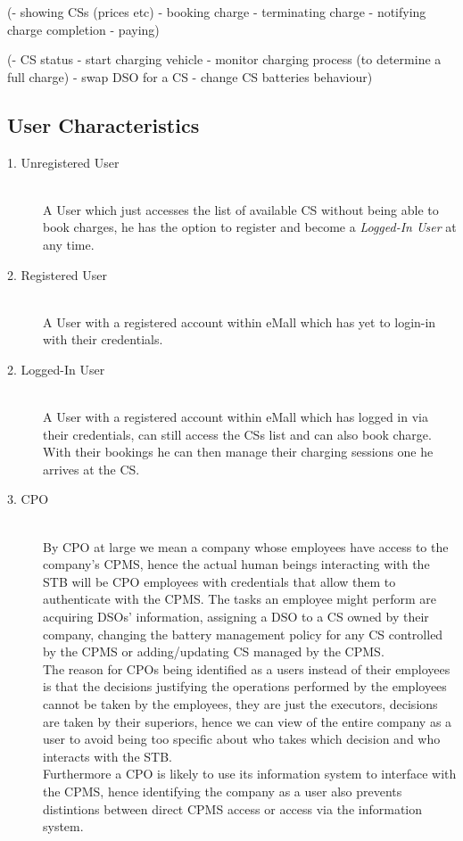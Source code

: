 \documentclass[11pt]{article}
\begin{document}
(- showing CSs (prices etc)
- booking charge
- terminating charge
- notifying charge completion
- paying)

(- CS status
- start charging vehicle
- monitor charging process (to determine a full charge)
- swap DSO for a CS
- change CS batteries behaviour)

\subsection{User Characteristics}

\begin{description}
    \item [1. Unregistered User] \hfill \\
        A User which just accesses the list of available CS without being able to book charges, he has the option to register and become a \textit{Logged-In User} at any time.
    \item [2. Registered User] \hfill \\
        A User with a registered account within eMall which has yet to login-in with their credentials.
    \item [2. Logged-In User] \hfill \\
        A User with a registered account within eMall which has logged in via their credentials, can still access the CSs list and can also book charge. With their bookings he can then manage their charging sessions one he arrives at the CS.
    \item [3. CPO] \hfill \\
        By CPO at large we mean a company whose employees have access to the company's CPMS, hence the actual human beings interacting with the STB will be CPO employees with credentials that allow them to authenticate with the CPMS. The tasks an employee might perform are acquiring DSOs' information, assigning a DSO to a CS owned by their company, changing the battery management policy for any CS controlled by the CPMS or adding/updating CS managed by the CPMS. \\
        The reason for CPOs being identified as a users instead of their employees is that the decisions justifying the operations performed by the employees cannot be taken by the employees, they are just the executors, decisions are taken by their superiors, hence we can view of the entire company as a user to avoid being too specific about who takes which decision and who interacts with the STB. \\
        Furthermore a CPO is likely to use its information system to interface with the CPMS, hence identifying the company as a user also prevents distintions between direct CPMS access or access via the information system.
\end{description}
\end{document}
